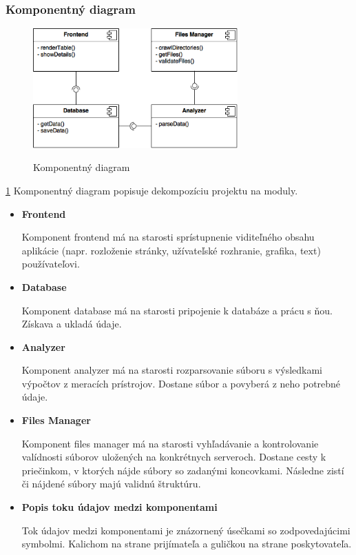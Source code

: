 \documentclass[12pt,a4paper]{article}
\begin{document}
\subsubsection{Komponentný diagram}
\begin{figure}[H]
	\centering
	\caption{Komponentný diagram}
	\includegraphics[width=0.7\textwidth]{komponentny_diagram}
	\label{fig:komponentny_diagram}
\end{figure}
\ref{fig:komponentny_diagram}
Komponentný diagram popisuje dekompozíciu projektu na moduly.
\begin{itemize}
	\item{\bf Frontend} \par
	Komponent frontend má na starosti sprístupnenie viditeľného obsahu aplikácie (napr. rozloženie stránky, užívateľské rozhranie, grafika, text) používateľovi.
	\item{\bf Database} \par
	Komponent database má na starosti pripojenie k databáze a prácu s ňou. Získava a ukladá údaje.
	\item{\bf Analyzer} \par
	Komponent analyzer má na starosti rozparsovanie súboru s výsledkami výpočtov z meracích prístrojov. Dostane súbor a povyberá z neho potrebné údaje.
	\item{\bf Files Manager} \par
	Komponent files manager má na starosti vyhľadávanie a kontrolovanie valídnosti súborov uložených na konkrétnych serveroch. Dostane cesty k priečinkom, v ktorých nájde súbory so zadanými koncovkami. Následne zistí či nájdené súbory majú validnú štruktúru.
	\item{\bf Popis toku údajov medzi komponentami} \par
	Tok údajov medzi komponentami je znázornený úsečkami so zodpovedajúcimi symbolmi. Kalichom na strane prijímateľa a guličkou na strane poskytovateľa.
\end{itemize}
\end{document}

